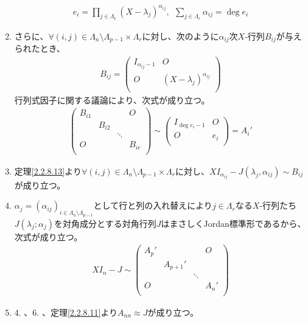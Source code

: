 \documentclass[dvipdfmx]{jsarticle}
\begin{document}
\begin{enumerate}
\begin{align*}
e_{i} = \prod_{j \in \varLambda_{r}} \left( X - \lambda_{j} \right)^{\alpha_{ij}},\ \ \sum_{j \in \varLambda_{r}} \alpha_{ij} = \deg e_{i}
\end{align*}
\item
  さらに、$\forall(i,j) \in \varLambda_{n} \setminus \varLambda_{p - 1} \times \varLambda_{r}$に対し、次のように$\alpha_{ij}$次$X$-行列$B_{ij}$が与えられたとき、
\begin{align*}
B_{ij} = \begin{pmatrix}
I_{\alpha_{ij} - 1} & O \\
O & \left( X - \lambda_{j} \right)^{\alpha_{ij}} \\
\end{pmatrix}
\end{align*}
行列式因子に関する議論により、次式が成り立つ。
\begin{align*}
\begin{pmatrix}
B_{i1} & \  & \  & O \\
\  & B_{i2} & \  & \  \\
\  & \  & \ddots & \  \\
O & \  & \  & B_{ir} \\
\end{pmatrix} \sim \begin{pmatrix}
I_{\deg e_{i} - 1} & O \\
O & e_{i} \\
\end{pmatrix} = A_{i}'
\end{align*}
\item
  定理\ref{2.2.8.13}より$\forall(i,j) \in \varLambda_{n} \setminus \varLambda_{p - 1} \times \varLambda_{r}$に対し、$XI_{\alpha_{ij}} - J\left( \lambda_{j},\alpha_{ij} \right) \sim B_{ij}$が成り立つ。
\item
  $\alpha_{j} = \left( \alpha_{ij} \right)_{i \in \varLambda_{n} \setminus \varLambda_{p - 1}}$として行と列の入れ替えにより$j \in \varLambda_{r}$なる$X$-行列たち$J\left( \lambda_{j};\alpha_{j} \right)$を対角成分とする対角行列$J$はまさしくJordan標準形であるから、次式が成り立つ。
\begin{align*}
XI_{n} - J \sim \begin{pmatrix}
A_{p}' & \  & \  & O \\
\  & A_{p + 1}' & \  & \  \\
\  & \  & \ddots & \  \\
O & \  & \  & A_{n}' \\
\end{pmatrix}
\end{align*}
\item
  4. 、6. 、定理\ref{2.2.8.11}より$A_{nn} \approx J$が成り立つ。
\end{enumerate}\par
\end{document}
